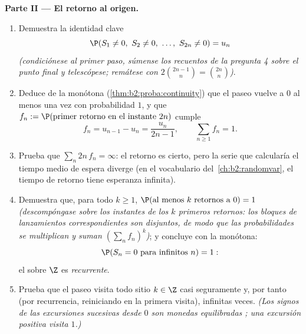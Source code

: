 \begin{problem}
\medskip
\noindent\textbf{Parte II --- El retorno al origen.}
\begin{enumerate}[resume]
  \item Demuestra la identidad clave
        \[
        \P(S_1 \neq 0,\ S_2 \neq 0,\ \dots,\ S_{2n} \neq 0) =
        u_n
        \]
        \emph{(condiciónese al primer paso, súmense los recuentos de
        la pregunta 4 sobre el punto final y telescópese; remátese
        con $2\binom{2n-1}{n} = \binom{2n}{n}$)}.
  \item Deduce de la  monótona
        (\cref{thm:b2:proba:continuity}) que el paseo vuelve a $0$
        al menos una vez con probabilidad $1$, y que $f_n :=
        \P(\text{primer retorno en el instante }2n)$ cumple
        \[
        f_n = u_{n-1} - u_n = \frac{u_n}{2n-1},
        \qquad \sum_{n\geq1}f_n = 1 .
        \]
  \item Prueba que $\sum_n 2n\,f_n = \infty$: el retorno es cierto,
        pero la serie que calcularía el tiempo medio de espera
        diverge (en el vocabulario del~\cref{ch:b2:randomvar}, el
        tiempo de retorno tiene esperanza infinita).
  \item Demuestra que, para todo $k \geq 1$, $\P(\text{al menos }
        k\text{ retornos a }0) = 1$ \emph{(descompóngase sobre los
        instantes de los $k$ primeros retornos: los bloques de
        lanzamientos correspondientes son disjuntos, de modo que las
        probabilidades se multiplican y suman $(\sum_nf_n)^k$)}; y
        concluye con la  monótona:
        \[
        \P(S_n = 0 \text{ para infinitos } n) = 1 :
        \]
        el  sobre $\Z$ es \emph{recurrente}.
  \item Prueba que el paseo visita todo sitio $k \in \Z$ casi
        seguramente y, por tanto (por recurrencia, reiniciando en la
        primera visita), infinitas veces. \emph{(Los signos de las
        excursiones sucesivas desde $0$ son monedas equilibradas
        ; una excursión positiva visita $1$.)}
\end{enumerate}


\end{problem}
